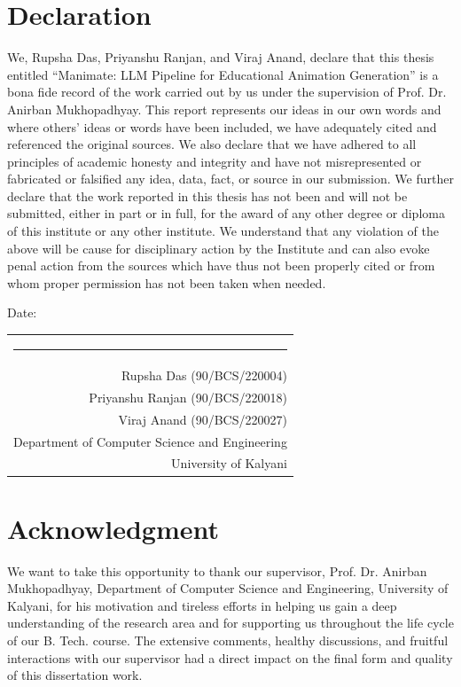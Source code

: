 \documentclass[12pt,a4paper,twoside,openright]{report}
\begin{document}
\chapter*{Declaration}
We, Rupsha Das, Priyanshu Ranjan, and Viraj Anand, declare that this thesis entitled ``Manimate: LLM Pipeline for Educational Animation Generation'' is a bona fide record of the work carried out by us under the supervision of Prof. Dr. Anirban Mukhopadhyay. This report represents our ideas in our own words and where others' ideas or words have been included, we have adequately cited and referenced the original sources. We also declare that we have adhered to all principles of academic honesty and integrity and have not misrepresented or fabricated or falsified any idea, data, fact, or source in our submission. We further declare that the work reported in this thesis has not been and will not be submitted, either in part or in full, for the award of any other degree or diploma of this institute or any other institute. We understand that any violation of the above will be cause for disciplinary action by the Institute and can also evoke penal action from the sources which have thus not been properly cited or from whom proper permission has not been taken when needed.

\vspace{2.5cm}
\noindent
Date: \hfill 
\begin{tabular}{r}
\rule{6cm}{0.4pt} \\
Rupsha Das (90/BCS/220004) \\
Priyanshu Ranjan (90/BCS/220018) \\
Viraj Anand (90/BCS/220027) \\
Department of Computer Science and Engineering \\
University of Kalyani
\end{tabular}

\cleardoublepage


\chapter*{Acknowledgment}
We want to take this opportunity to thank our supervisor, Prof. Dr. Anirban Mukhopadhyay, Department of Computer Science and Engineering, University of Kalyani, for his motivation and tireless efforts in helping us gain a deep understanding of the research area and for supporting us throughout the life cycle of our B. Tech. course. The extensive comments, healthy discussions, and fruitful interactions with our supervisor had a direct impact on the final form and quality of this dissertation work.
\end{document}

